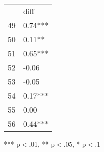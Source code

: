 \documentclass{article}
\begin{document}
\begin{table}[!h]
\centering
\begin{tabular}{ll}
\cline{1-2}
\multicolumn{1}{|l}{} &
  \multicolumn{1}{|l|}{diff} \\
\cline{1-2}
\multicolumn{1}{|l}{49} &
  \multicolumn{1}{|l|}{0.74***} \\
\cline{1-2}
\multicolumn{1}{|l}{50} &
  \multicolumn{1}{|l|}{0.11**} \\
\cline{1-2}
\multicolumn{1}{|l}{51} &
  \multicolumn{1}{|l|}{0.65***} \\
\cline{1-2}
\multicolumn{1}{|l}{52} &
  \multicolumn{1}{|l|}{-0.06} \\
\cline{1-2}
\multicolumn{1}{|l}{53} &
  \multicolumn{1}{|l|}{-0.05} \\
\cline{1-2}
\multicolumn{1}{|l}{54} &
  \multicolumn{1}{|l|}{0.17***} \\
\cline{1-2}
\multicolumn{1}{|l}{55} &
  \multicolumn{1}{|l|}{0.00} \\
\cline{1-2}
\multicolumn{1}{|l}{56} &
  \multicolumn{1}{|l|}{0.44***} \\
\cline{1-2}
\end{tabular}

\footnotesize{
*** p$<$.01, ** p$<$.05, * p$<$.1
}
\end{table}
\end{document}
